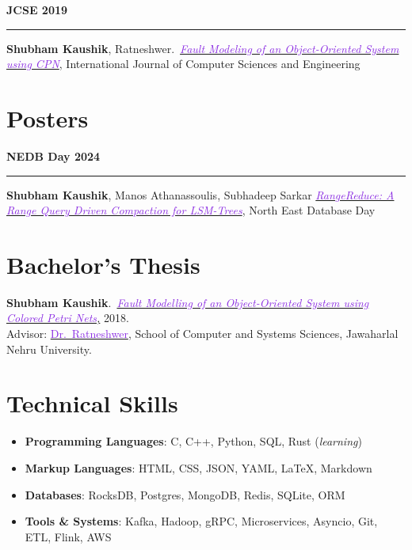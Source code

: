 \documentclass[10pt,a4paper,calibri]{moderncv}
\newcommand{\mediumspace}{\vspace{0.6em}}
\newcommand{\publications}[2]{
  \noindent
  \begin{minipage}[c]{0.15\textwidth}
    \centering
    \textbf{#1}
  \end{minipage}%
  \hspace{0.01\textwidth}
  \begin{minipage}[c]{0.02\textwidth}
    \textcolor{lightgray}{\rule{1pt}{0.75cm}}
  \end{minipage}%
  \begin{minipage}[c]{0.80\textwidth}
    \raggedright{
      #2
    }
  \end{minipage}%
}
\begin{document}
\mediumspace

\publications{JCSE 2019}{\textbf{Shubham Kaushik}, Ratneshwer.\ \href{https://doi.org/10.26438/ijcse/v7i5.18281845}{\textit{\textcolor{blueviolet}{Fault
				Modeling of an Object-Oriented System using CPN}}}, International Journal of Computer Sciences and Engineering}

\mediumspace

\section{Posters}
\publications{NEDB Day 2024}{\textbf{Shubham Kaushik}, Manos Athanassoulis, Subhadeep Sarkar \href{https://bu-disc.github.io/nedbday/2024/download/posters/RangeReduce_A_Range_Query_Driven_Compaction_for_LSM-Trees.pdf}{\textit{\textcolor{blueviolet}{RangeReduce: A Range Query Driven Compaction for LSM-Trees}}}, North East Database Day}


\section{Bachelor's Thesis}
\textbf{Shubham Kaushik}.\ \href{https://doi.org/10.26438/ijcse/v7i5.18281845}
{\textit{\textcolor{blueviolet}{Fault Modelling of an Object-Oriented System using Colored Petri Nets},}} 2018.\\
Advisor:
\href{https://www.jnu.ac.in/content/ratnesh}{\textcolor{blueviolet}{Dr.\
		Ratneshwer}}, School of Computer and Systems Sciences, Jawaharlal Nehru
University.




\section{Technical Skills}
\begin{itemize}\setlength\itemsep{0.4em}
	\item \textbf{Programming Languages}: C, C++, Python, SQL, Rust (\textit{learning})
	\item \textbf{Markup Languages}: HTML, CSS, JSON, YAML, \LaTeX, Markdown
	\item \textbf{Databases}: RocksDB, Postgres, MongoDB, Redis, SQLite, ORM
	\item \textbf{Tools \& Systems}: Kafka, Hadoop, gRPC, Microservices, Asyncio, Git, ETL, Flink, AWS
\end{itemize}
\end{document}
